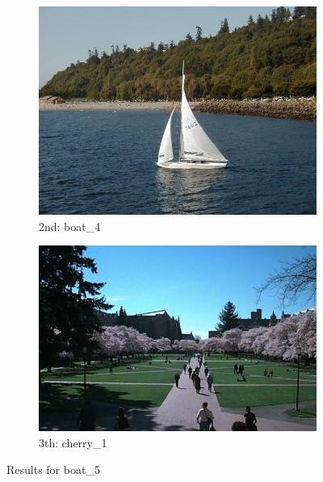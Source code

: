 \begin{itemize}
\begin{figure}[H]
\begin{subfigure}{0.25\textwidth}
        \includegraphics[width=0.9\linewidth]{../input/boat_4.jpg}
        \caption{2nd: boat\_4}
    \end{subfigure}%
    \begin{subfigure}{0.25\textwidth}
	  \centering
	  \includegraphics[width=0.9\linewidth]{../input/cherry_1.jpg}
	    \caption{3th: cherry\_1}
	\end{subfigure}
    \caption{Results for boat\_5}
    \label{fig:results_boat_5}
\end{figure}


\end{itemize}
